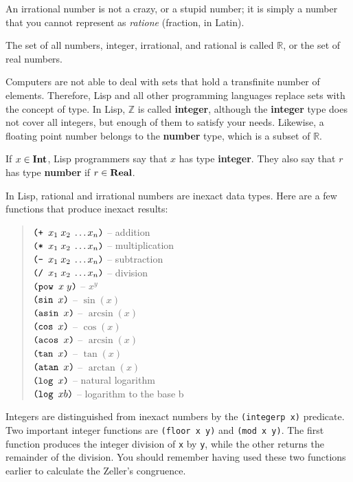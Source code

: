 \documentclass[a4paper,12pt]{book}
\begin{document}
An irrational number
is not a crazy, or a stupid number; it is simply a number that you cannot represent
as {\em ratione} (fraction, in Latin).

The set of all numbers, integer, 
irrational, and rational is called $\mathbb{R}$, or
the set of real numbers. 

Computers are not able to deal
with sets that hold a transfinite number of
elements. Therefore, Lisp and
all other programming languages
replace sets with the concept of type.
In Lisp, $\mathbb{Z}$ is 
called {\bf integer}, although
the {\bf integer} type does not cover all integers, 
but enough of them to satisfy
your needs. Likewise, a floating point
number belongs to the {\bf number} type, 
which is a subset of $\mathbb{R}$.


If $x\in{\bf Int}$, Lisp programmers say 
that $x$ has 
type\label{type:definition}  {\bf integer}. 
They also say that $r$ has 
type {\bf number} if $r\in {\bf Real}$.

In Lisp, rational and irrational numbers
are inexact data types. Here are a few functions
that produce inexact results:
\begin{quote}
$\verb|(+ |x_1\;x_2\;\ldots x_n\verb|)|$ -- addition\\
$\verb|(* |x_1\;x_2\;\ldots x_n\verb|)|$ -- multiplication\\
$\verb|(- |x_1\;x_2\;\ldots x_n\verb|)|$ -- subtraction\\
$\verb|(/ |x_1\;x_2\;\ldots x_n\verb|)|$ -- division\\
$\verb|(pow |x\;y\verb|)|$ -- $x^y$\\
$\verb|(sin | x \verb|)|$ -- $\sin(x)$\\
$\verb|(asin | x \verb|)|$ -- $\arcsin(x)$\\
$\verb|(cos | x \verb|)|$ -- $\cos(x)$\\
$\verb|(acos | x \verb|)|$ -- $\arcsin(x)$\\ 
$\verb|(tan | x \verb|)|$ -- $\tan(x)$\\
$\verb|(atan | x \verb|)|$ -- $\arctan(x)$\\
$\verb|(log | x \verb|)|$ -- natural logarithm\\
$\verb|(log | x b\verb|)|$ -- logarithm to the base b
\end{quote}
Integers are distinguished from inexact numbers by the
\verb|(integerp x)| predicate. Two important integer
functions are \verb|(floor x y)| and \verb|(mod x y)|.
The first function produces the integer division of
\verb|x| by \verb|y|, while the other returns
the remainder of the division. You should remember
having used these two functions earlier to calculate
the Zeller's congruence.
\end{document}
